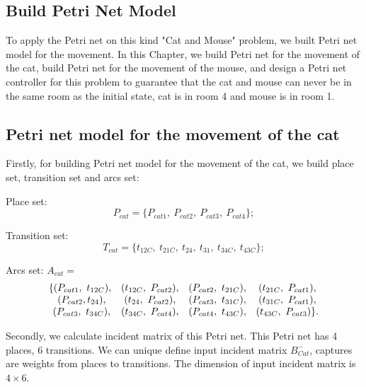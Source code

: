 \documentclass[11pt]{article}
\begin{document}
\begin{flushleft}
\section{Build Petri Net Model}
	To apply the Petri net on this kind "Cat and Mouse" problem, we built Petri net model for the movement. In this Chapter, we build Petri net for the movement of the cat, build Petri net for the movement of the mouse, and design a Petri net controller for this problem to guarantee that the cat and mouse can never be in the same room as the initial state, cat is in room 4 and mouse is in room 1.
	
	\subsection{Petri net model for the movement of the cat}
	Firstly, for building Petri net model for the movement of the cat, we build place set, transition set and arcs set:
	
	Place set: $$P_{cat}=\{P_{cat1},\ P_{cat2},\ P_{cat3},\ P_{cat4}\};$$
	
	Transition set: $$T_{cat}=\{t_{12C},\ t_{21C},\ t_{24},\ t_{31},\  t_{34C},\ t_{43C}\};$$
	
	Arcs set: $A_{cat}=$
	\begin{equation*}
	\begin{array}{*{4}c}
	\{(P_{cat1},\ t_{12C}), & (t_{12C},\ P_{cat2}), & (P_{cat2},\ t_{21C}), & (t_{21C},\ P_{cat1}),\\
	\ (P_{cat2}, t_{24}), & (t_{24},\ P_{cat2}), & (P_{cat3},\ t_{31C}), & (t_{31C},\ P_{cat1}),\\
	\ (P_{cat3},\ t_{34C}), & (t_{34C},\ P_{cat4}), & (P_{cat4},\ t_{43C}), & (t_{43C},\ P_{cat3})\}.
	\end{array}
	\end{equation*}
	
	
	Secondly, we calculate incident matrix of this Petri net. This Petri net has 4 places, 6 transitions. We can unique define input incident matrix $B_{Cat}^-$, captures are weights from places to transitions. The dimension of input incident matrix is $4\times 6$.
	

\end{flushleft}
\end{document}
